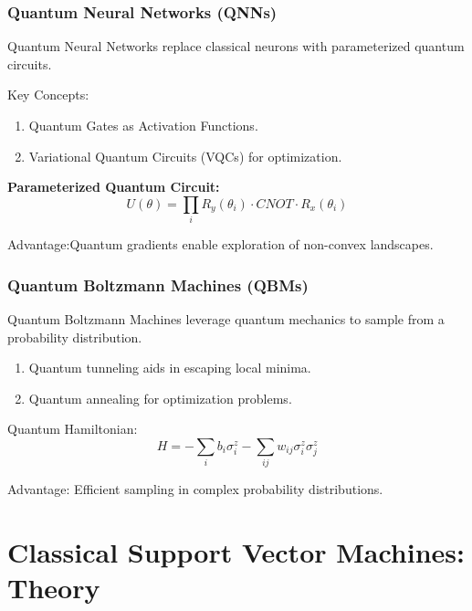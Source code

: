\documentclass{beamer}
\begin{document}
\begin{frame}
\frametitle{Quantum Neural Networks (QNNs)}

Quantum Neural Networks replace classical neurons with parameterized quantum circuits.
\begin{block}{Key Concepts: }
\begin{enumerate}
\item Quantum Gates as Activation Functions.

\item Variational Quantum Circuits (VQCs) for optimization.
\end{enumerate}

\noindent
\end{block}
\begin{block}{}
\textbf{Parameterized Quantum Circuit:}
\[
U(\theta) = \prod_i R_y(\theta_i) \cdot CNOT \cdot R_x(\theta_i)
\]
\end{block}
Advantage:Quantum gradients enable exploration of non-convex landscapes.
\end{frame}

\begin{frame}
\frametitle{Quantum Boltzmann Machines (QBMs)}

Quantum Boltzmann Machines leverage quantum mechanics to sample from a probability distribution.

\begin{block}{}
\begin{enumerate}
\item Quantum tunneling aids in escaping local minima.

\item Quantum annealing for optimization problems.
\end{enumerate}

\noindent
\end{block}
\begin{block}{Quantum Hamiltonian: }
\[
H = -\sum_i b_i \sigma_i^z - \sum_{ij} w_{ij} \sigma_i^z \sigma_j^z
\]
\end{block}
Advantage: Efficient sampling in complex probability distributions.
\end{frame}


\section{Classical Support Vector Machines: Theory}
\end{document}
